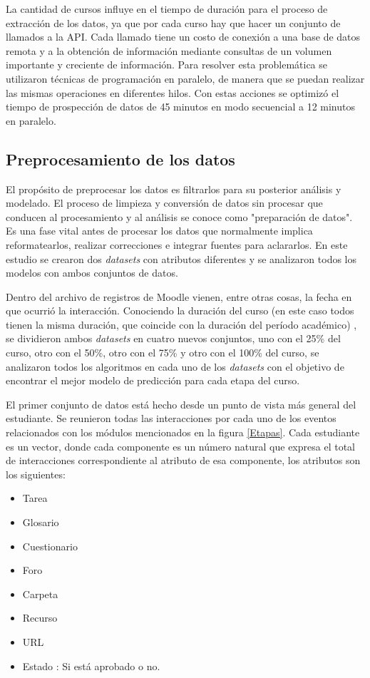 La cantidad de cursos influye en el tiempo de duración para el proceso de extracción de los datos, ya que por cada curso hay que hacer un conjunto de llamados a la API. Cada llamado tiene un costo de conexión a una base de datos remota y a la obtención de información mediante consultas de un volumen importante y creciente de información. Para resolver esta problemática se utilizaron técnicas de programación en paralelo, de manera que se puedan realizar las mismas operaciones en diferentes hilos. Con estas acciones se optimizó el tiempo de prospección de datos de 45 minutos en modo secuencial a 12 minutos en paralelo.
\subsection{Preprocesamiento de los datos}

El propósito de preprocesar los datos es filtrarlos para su posterior análisis y modelado. El proceso de limpieza y conversión de datos sin procesar que conducen al procesamiento y al análisis se conoce como "preparación de datos". Es una fase vital antes de procesar los datos que normalmente implica reformatearlos, realizar correcciones e integrar fuentes para aclararlos. En este estudio se crearon dos \textit{datasets} con atributos diferentes y se analizaron todos los modelos con ambos conjuntos de datos. 

Dentro del archivo de registros de Moodle vienen, entre otras cosas, la fecha en que ocurrió la interacción. Conociendo la duración del curso (en este caso todos tienen la misma duración, que coincide con la duración del período académico) , se dividieron ambos \textit{datasets} en cuatro nuevos conjuntos, uno con el 25\% del curso, otro con el 50\%, otro con el 75\% y otro con el 100\% del curso, se analizaron todos los algoritmos en cada uno de los \textit{datasets} con el objetivo de encontrar el mejor modelo de predicción para cada etapa del curso.

El primer conjunto de datos está hecho desde un punto de vista más general del estudiante. Se reunieron todas las interacciones por cada uno de los eventos relacionados con los módulos mencionados en la figura \ref{Etapas}. Cada estudiante es un vector, donde cada componente es un número natural que expresa el total de interacciones correspondiente al atributo de esa componente, los atributos son los siguientes: 

\begin{itemize}
    \item Tarea
    \item Glosario
    \item Cuestionario
    \item Foro
    \item Carpeta
    \item Recurso
    \item URL
    \item Estado : Si está aprobado o no.
\end{itemize}


